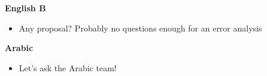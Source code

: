 % 
% 
% 
% 


% 
%  
%  
%  




\textbf{English B}
\begin{itemize}
 \item Any proposal? Probably no questions enough for an error analysis
\end{itemize}



\textbf{Arabic}

\begin{itemize}
 \item Let's ask the Arabic team!
\end{itemize}

